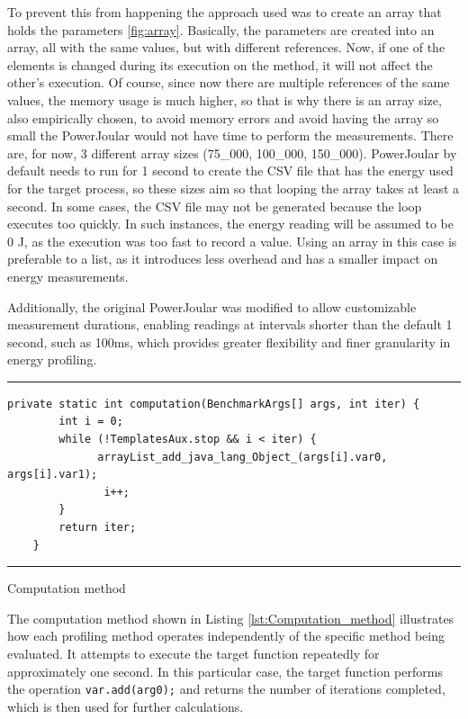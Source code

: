 To prevent this from happening the approach used was to create an array that holds the parameters \ref{fig:array}. Basically, the parameters are created into an array, all with the same values, but with different references. Now, if one of the elements is changed during its execution on the method, it will not affect the other's execution. Of course, since now there are multiple references of the same values, the memory usage is much higher, so that is why there is an array size, also empirically chosen, to avoid memory errors and avoid having the array so small the PowerJoular would not have time to perform the measurements. There are, for now, 3 different array sizes (75\_000, 100\_000, 150\_000). PowerJoular by default needs to run for 1 second to create the CSV file that has the energy used for the target process, so these sizes aim so that looping the array takes at least a second. In some cases, the CSV file may not be generated because the loop executes too quickly. In such instances, the energy reading will be assumed to be 0 J, as the execution was too fast to record a value. Using an array in this case is preferable to a list, as it introduces less overhead and has a smaller impact on energy measurements.

Additionally, the original PowerJoular was modified to allow customizable measurement durations, enabling readings at intervals shorter than the default 1 second, such as 100ms, which provides greater flexibility and finer granularity in energy profiling.


\begin{listing}[H]
\noindent\rule{\linewidth}{0.4pt}
\begin{verbatim}
private static int computation(BenchmarkArgs[] args, int iter) {
        int i = 0;
        while (!TemplatesAux.stop && i < iter) {
              arrayList_add_java_lang_Object_(args[i].var0, args[i].var1);
               i++;
        }
        return iter;
    }
\end{verbatim}
\noindent\rule{\linewidth}{0.4pt}
\caption{Computation method}            
\label{lst:Computation_method}
\end{listing}

The computation method shown in Listing \ref{lst:Computation_method} illustrates how each profiling method operates independently of the specific method being evaluated. It attempts to execute the target function repeatedly for approximately one second. In this particular case, the target function performs the operation \texttt{var.add(arg0);} and returns the number of iterations completed, which is then used for further calculations.


